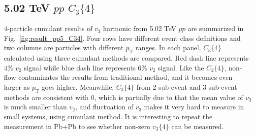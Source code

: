 \subsection{5.02 TeV $pp$ $C_{3}\{4\}$}
4-particle cumulant results of $v_{3}$ harmonic from 5.02 TeV $pp$ are summarized in Fig.~\ref{fig:result_pp5_C34}. Four rows have different event class definitions and two columns are particles with different $p_{\text{T}}$ ranges. In each panel, $C_{3}\{4\}$ calculated using three cumulant methods are compared. Red dash line represents $4\%$ $v_{2}$ signal while blue dash line represents $6\%$ $v_{2}$ signal. Like the $C_{2}\{4\}$, non-flow contaminates the results from traditional method, and it becomes even larger as $p_{\text{T}}$ goes higher. Meanwhile, $C_{3}\{4\}$ from 2 sub-event and 3 sub-event methods are consistent with 0, which is partially due to that the mean value of $v_{3}$ is much smaller than $v_{2}$, and fluctuation of $v_{3}$ makes it very hard to measure in small systems, using cumulant method. It is interesting to repeat the measurement in Pb+Pb to see whether non-zero $v_{3}\{4\}$ can be measured.
